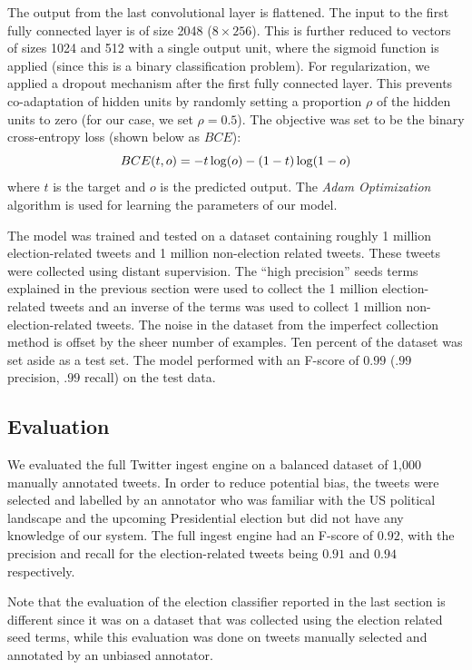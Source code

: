 \documentclass[letterpaper]{article}
\begin{document}
The output from the last convolutional layer is flattened. The input to the first fully connected layer is of size 2048 ($8\times 256$). This is further reduced to vectors of sizes 1024 and 512 with a single output unit, where the sigmoid function is applied (since this is a binary classification problem). For regularization, we applied a dropout mechanism after the first fully connected layer. This prevents co-adaptation of hidden units by randomly setting a proportion $\rho$ of the hidden units to zero (for our case, we set $\rho=0.5$). The objective was set to be the binary cross-entropy loss (shown below as $BCE$):
\begin{equation}BCE(t,o)=-t\log(o) -\\ (1-t)\log(1-o)\end{equation}
where $t$ is the target and $o$ is the predicted output. The \emph{Adam Optimization} algorithm \cite{kingma2014adam} is used for learning the parameters of our model.

The model was trained and tested on a dataset containing roughly 1 million election-related tweets and 1 million non-election related tweets. These tweets were collected using distant supervision. The ``high precision'' seeds terms explained in the previous section were used to collect the 1 million election-related tweets and an inverse of the terms was used to collect 1 million non-election-related tweets. The noise in the dataset from the imperfect collection method is offset by the sheer number of examples. Ten percent of the dataset was set aside as a test set. The model performed with an F-score of $0.99$ ($.99$ precision, $.99$ recall) on the test data.%

\subsection{Evaluation} We evaluated the full Twitter ingest engine on a balanced dataset of 1,000 manually annotated tweets. In order to reduce potential bias, the tweets were selected and labelled by an annotator who was familiar with the US political landscape and the upcoming Presidential election but did not have any knowledge of our system. The full ingest engine had an F-score of $0.92$, with the precision and recall for the election-related tweets being $0.91$ and $0.94$ respectively.

Note that the evaluation of the election classifier reported in the last section is different since it was on a dataset that was collected using the election related seed terms, while this evaluation was done on tweets manually selected and annotated by an unbiased annotator. %
\end{document}
